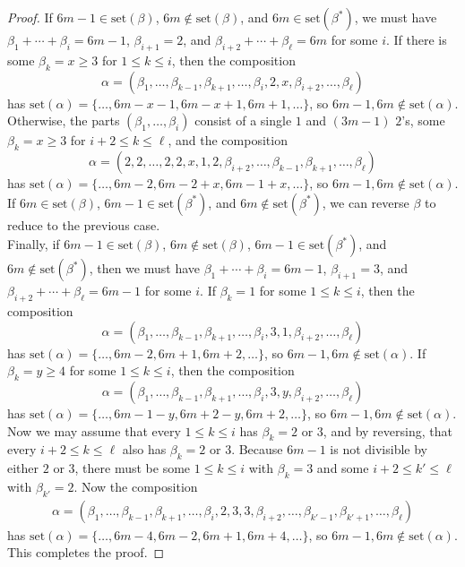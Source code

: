\documentclass[12pt]{amsart}  %
\theoremstyle{definition}
\theoremstyle{remark}
\numberwithin{equation}{section}
\begin{document}
\begin{proof}
If $6m-1\in\text{set}(\beta)$, $6m\notin\text{set}(\beta)$, and $6m\in\text{set}(\beta^*)$, we must have $\beta_1+\cdots+\beta_i=6m-1$, $\beta_{i+1}=2$, and $\beta_{i+2}+\cdots+\beta_\ell=6m$ for some $i$. If there is some $\beta_k=x\geq 3$ for $1\leq k\leq i$, then the composition
\begin{equation*}
\alpha=(\beta_1,\ldots,\beta_{k-1},\beta_{k+1},\ldots,\beta_i,2,x,\beta_{i+2},\ldots,\beta_\ell)
\end{equation*}
has $\text{set}(\alpha)=\{\ldots,6m-x-1,6m-x+1,6m+1,\ldots\}$, so $6m-1,6m\notin\text{set}(\alpha)$. Otherwise, the parts $(\beta_1,\ldots,\beta_i)$ consist of a single $1$ and $(3m-1)$ $2$'s, some $\beta_k=x\geq 3$ for $i+2\leq k\leq \ell$, and the composition
\begin{equation*}
\alpha=(2,2,\ldots,2,2,x,1,2,\beta_{i+2},\ldots,\beta_{k-1},\beta_{k+1},\ldots,\beta_\ell)
\end{equation*}
has $\text{set}(\alpha)=\{\ldots,6m-2,6m-2+x,6m-1+x,\ldots\}$, so $6m-1,6m\notin\text{set}(\alpha)$. If $6m\in\text{set}(\beta)$, $6m-1\in\text{set}(\beta^*)$, and $6m\notin\text{set}(\beta^*)$, we can reverse $\beta$ to reduce to the previous case.\\

Finally, if $6m-1\in\text{set}(\beta)$, $6m\notin\text{set}(\beta)$, $6m-1\in\text{set}(\beta^*)$, and $6m\notin\text{set}(\beta^*)$, then we must have $\beta_1+\cdots+\beta_i=6m-1$, $\beta_{i+1}=3$, and $\beta_{i+2}+\cdots+\beta_\ell=6m-1$ for some $i$. If $\beta_k=1$ for some $1\leq k\leq i$, then the composition
\begin{equation*}
\alpha=(\beta_1,\ldots,\beta_{k-1},\beta_{k+1},\ldots,\beta_i,3,1,\beta_{i+2},\ldots,\beta_\ell)
\end{equation*}
has $\text{set}(\alpha)=\{\ldots,6m-2,6m+1,6m+2,\ldots\}$, so $6m-1,6m\notin\text{set}(\alpha)$. If $\beta_k=y\geq 4$ for some $1\leq k\leq i$, then the composition
\begin{equation*}
\alpha=(\beta_1,\ldots,\beta_{k-1},\beta_{k+1},\ldots,\beta_i,3,y,\beta_{i+2},\ldots,\beta_\ell)
\end{equation*}
has $\text{set}(\alpha)=\{\ldots,6m-1-y,6m+2-y,6m+2,\ldots\}$, so $6m-1,6m\notin\text{set}(\alpha)$. Now we may assume that every $1\leq k\leq i$ has $\beta_k=2$ or $3$, and by reversing, that every $i+2\leq k\leq\ell$ also has $\beta_k=2$ or $3$. Because $6m-1$ is not divisible by either $2$ or $3$, there must be some $1\leq k\leq i$ with $\beta_k=3$ and some $i+2\leq k'\leq\ell$ with $\beta_{k'}=2$. Now the composition
\begin{align*}
\alpha=(\beta_1,\ldots,\beta_{k-1},\beta_{k+1},\ldots,\beta_i,2,3,3,\beta_{i+2},\ldots,\beta_{k'-1},\beta_{k'+1},\ldots,\beta_\ell)
\end{align*}
has $\text{set}(\alpha)=\{\ldots,6m-4,6m-2,6m+1,6m+4,\ldots\}$, so $6m-1,6m\notin\text{set}(\alpha)$. This completes the proof.
\end{proof}
\end{document}
